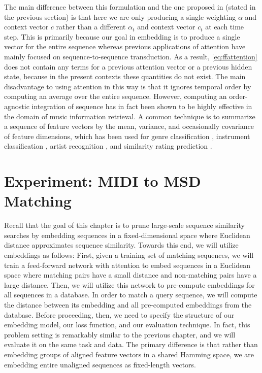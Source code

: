 The main difference between this formulation and the one proposed in \cite{bahdanau2014neural, cho2015describing} (stated in the previous section) is that here we are only producing a single weighting $\alpha$ and context vector $c$ rather than a different $\alpha_t$ and context vector $c_t$ at each time step.
This is primarily because our goal in embedding is to produce a single vector for the entire sequence whereas previous applications of attention have mainly focused on sequence-to-sequence transduction.
As a result, \cref{eq:ffattention} does not contain any terms for a previous attention vector or a previous hidden state, because in the present contexts these quantities do not exist.
The main disadvantage to using attention in this way is that it ignores temporal order by computing an average over the entire sequence.
However, computing an order-agnostic integration of sequence has in fact been shown to be highly effective in the domain of music information retrieval.
A common technique is to summarize a sequence of feature vectors by the mean, variance, and occasionally covariance of feature dimensions, which has been used for genre classification \cite{tzanetakis2002musical}, instrument classification \cite{deng2008study}, artist recognition \cite{mandel2005song}, and similarity rating prediction \cite{foster2014sequential}.

\section{Experiment: MIDI to MSD Matching}
\label{sec:pse_experiment}

Recall that the goal of this chapter is to prune large-scale sequence similarity searches by embedding sequences in a fixed-dimensional space where Euclidean distance approximates sequence similarity.
Towards this end, we will utilize embeddings as follows:
First, given a training set of matching sequences, we will train a feed-forward network with attention to embed sequences in a Euclidean space where matching pairs have a small distance and non-matching pairs have a large distance.
Then, we will utilize this network to pre-compute embeddings for all sequences in a database.
In order to match a query sequence, we will compute the distance between its embedding and all pre-computed embeddings from the database.
Before proceeding, then, we need to specify the structure of our embedding model, our loss function, and our evaluation technique.
In fact, this problem setting is remarkably similar to the previous chapter, and we will evaluate it on the same task and data.
The primary difference is that rather than embedding groups of aligned feature vectors in a shared Hamming space, we are embedding entire unaligned sequences as fixed-length vectors.

